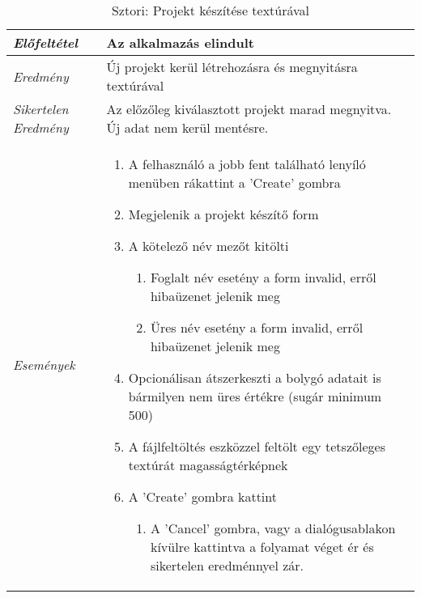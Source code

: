 \begin{table}[H]
	\centering
	\begin{tabular}{ | m{} | m{} | }
		\hline
		\emph{Előfeltétel} & Az alkalmazás elindult  \\
		\hline
		\emph{Eredmény} & Új projekt kerül létrehozásra és megnyitásra textúrával  \\
		\hline
		\emph{Sikertelen Eredmény} & Az előzőleg kiválasztott projekt marad megnyitva. Új adat nem kerül mentésre.  \\
		\hline
		\hline
		\emph{Események} &

		\begin{enumerate}
			\item A felhasználó a jobb fent található lenyíló menüben rákattint a 'Create' gombra
			\item Megjelenik a projekt készítő form
			\item A kötelező név mezőt kitölti
			\begin{enumerate}
				\item Foglalt név esetény a form invalid, erről hibaüzenet jelenik meg
				\item Üres név esetény a form invalid, erről hibaüzenet jelenik meg
			\end{enumerate}
			\item Opcionálisan átszerkeszti a bolygó adatait is bármilyen nem üres értékre (sugár minimum 500)
			\item A fájlfeltöltés eszközzel feltölt egy tetszőleges textúrát magasságtérképnek
			\item A 'Create' gombra kattint
			\begin{enumerate}
				\item A 'Cancel' gombra, vagy a dialógusablakon kívülre kattintva a folyamat véget ér és sikertelen eredménnyel zár.
			\end{enumerate}
		\end{enumerate}

		\\
		\hline
	\end{tabular}
	\caption{Sztori: Projekt készítése textúrával}
	\label{tab:story-project-create-texture}
\end{table}

